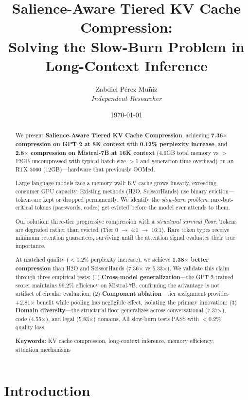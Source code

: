\documentclass[11pt]{article}
\title{Salience-Aware Tiered KV Cache Compression: \\ Solving the Slow-Burn Problem in Long-Context Inference}
\author{Zabdiel Pérez Muñiz \\\textit{Independent Researcher}}
\date{\today}
\begin{document}
\maketitle

\begin{abstract}
We present \textbf{Salience-Aware Tiered KV Cache Compression}, achieving \textbf{7.36$\times$ compression on GPT-2 at 8K context} with \textbf{0.12\% perplexity increase}, and \textbf{2.8$\times$ compression on Mistral-7B at 16K context} (4.6GB total memory vs $>$12GB uncompressed with typical batch size $>$1 and generation-time overhead) on an RTX 3060 (12GB)---hardware that previously OOMed.

Large language models face a memory wall: KV cache grows linearly, exceeding consumer GPU capacity. Existing methods (H2O, ScissorHands) use binary eviction---tokens are kept or dropped permanently. We identify the \textit{slow-burn problem}: rare-but-critical tokens (passwords, codes) get evicted before the model ever attends to them.

Our solution: three-tier progressive compression with a \textit{structural survival floor}. Tokens are degraded rather than evicted (Tier 0 $\rightarrow$ 4:1 $\rightarrow$ 16:1). Rare token types receive minimum retention guarantees, surviving until the attention signal evaluates their true importance.

At matched quality ($<$0.2\% perplexity increase), we achieve \textbf{1.38$\times$ better compression} than H2O and ScissorHands (7.36$\times$ vs 5.33$\times$). We validate this claim through three empirical tests: (1) \textbf{Cross-model generalization}---the GPT-2-trained scorer maintains 99.2\% efficiency on Mistral-7B, confirming the advantage is not artifact of circular evaluation; (2) \textbf{Component ablation}---tier assignment provides +2.81$\times$ benefit while pooling has negligible effect, isolating the primary innovation; (3) \textbf{Domain diversity}---the structural floor generalizes across conversational (7.37$\times$), code (4.55$\times$), and legal (5.83$\times$) domains. All slow-burn tests PASS with $<$0.2\% quality loss.

\textbf{Keywords:} KV cache compression, long-context inference, memory efficiency, attention mechanisms
\end{abstract}

\section{Introduction}
\end{document}
